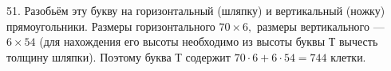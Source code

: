 51. Разобьём эту букву на горизонтальный (шляпку) и вертикальный (ножку) прямоугольники. Размеры горизонтального $70\times6,$ размеры вертикального --- $6\times54$ (для нахождения его высоты необходимо из высоты буквы Т вычесть толщину шляпки). Поэтому буква Т содержит $70\cdot6+6\cdot54=744$ клетки.\\
